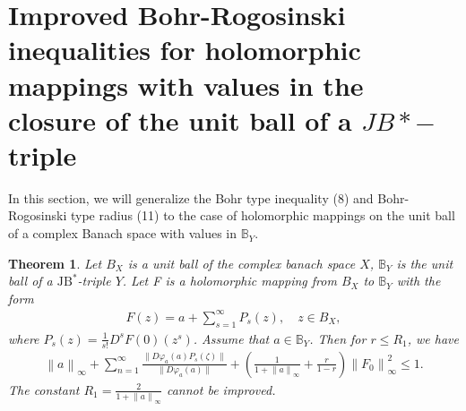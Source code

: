 \documentclass{birkjour}
\theoremstyle{plain}
\newtheorem{thm}{Theorem}
\theoremstyle{definition}
\theoremstyle{definition}
\begin{document}
\section{Improved Bohr-Rogosinski inequalities for holomorphic mappings with values in the closure of the unit ball of a $JB*-$triple}\label{sec4}
In this section, we will generalize the Bohr type inequality (8) and Bohr-Rogosinski type radius (11) to the case of holomorphic mappings on the unit ball of a complex Banach space with values in $\mathbb{B}_Y$.

\begin{thm}
	Let $B_X$ is a unit ball of the complex banach space $X$, $\mathbb{B}_Y$ is the unit ball of a $\mathrm{JB}^*$-triple $Y$. Let F is a holomorphic mapping from $B_X $ to $\mathbb{B}_Y$ with the form	
	\begin{align*}
		F(z)=a+\sum_{s=1}^{\infty} P_s(z),\quad z \in B_X,
	\end{align*}
	where $P_s(z)=\frac{1}{s!} D^sF(0)(z^s)$.
	Assume that $a \in \mathbb{B}_Y$. Then for $r \le R_1$, we have
	\begin{align}
		\left \| a \right \| _\infty +\sum_{n=1}^{\infty} \frac{\|D\varphi_a(a)P_s(\zeta)\|}{\|D\varphi_a(a)\|}+(\frac{1}{1+\left \| a \right \| _\infty} +\frac{r}{1-r} )\left \| F_0 \right \|^2_\infty \le 1.
	\end{align}
	The constant $R_1=\frac{2}{1+\left \| a \right \| _\infty}$ cannot be improved.
\end{thm}
\end{document}
